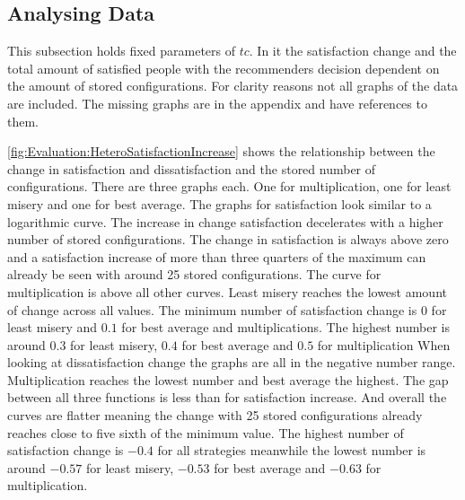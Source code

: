 \subsection{Analysing Data}

This subsection holds fixed parameters of $tc$. In it the satisfaction change and the total amount of satisfied people with the recommenders decision dependent on the amount of stored configurations. For clarity reasons not all graphs of the data are included. The missing graphs are in the appendix and have references to them.

\autoref{fig:Evaluation:HeteroSatisfactionIncrease} shows the relationship between the change in satisfaction and dissatisfaction and the stored number of configurations. There are three graphs each. One for multiplication, one for least misery and one for best average. The graphs for satisfaction look similar to a logarithmic curve. The increase in change satisfaction decelerates with a higher number of stored configurations. The change in satisfaction is always above zero and a satisfaction increase of more than three quarters of the maximum can already be seen with around 25 stored configurations. The curve for multiplication is above all other curves. Least misery reaches the lowest amount of change across all values. The minimum number of satisfaction change is $0$ for least misery and $0.1$ for best average and multiplications. The highest number is around $0.3$ for least misery, $0.4$ for best average and $0.5$ for multiplication
When looking at dissatisfaction change the graphs are all in the negative number range. Multiplication reaches the lowest number and best average the highest. The gap between all three functions is less than for satisfaction increase. And overall the curves are flatter meaning the change with 25 stored configurations already reaches close to five sixth of the minimum value. The highest number of satisfaction change is $-0.4$ for all strategies meanwhile the lowest number is around $-0.57$ for least misery, $-0.53$ for best average and $-0.63$ for multiplication.

